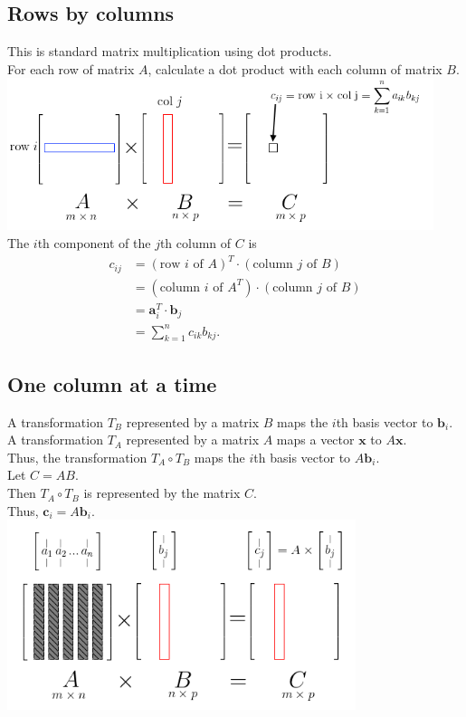 \documentclass{scrartcl}
\begin{document}
\subsection{Rows by columns}
This is standard matrix multiplication using dot products.\\
For each row of matrix \(A\), calculate a dot product with each column of matrix \(B\).\\
\includegraphics[height=12em]{row-by-columns.png}\\
The \(i\)th component of the \(j\)th column of \(C\) is
\begin{align*}
  c_{ij} &= (\text{row \(i\) of \(A\)})^T \cdot (\text{column \(j\) of \(B\)})\\
         &= (\text{column \(i\) of \(A^T\)}) \cdot (\text{column \(j\) of \(B\)})\\
         &= \mathbf{a}^T_i \cdot \mathbf{b}_j\\
         &= \sum_{k=1}^n{c_{ik}b_{kj}}\text{.}
\end{align*}

\subsection{One column at a time}
A transformation \(T_B\) represented by a matrix \(B\) maps the \(i\)th basis vector to \(\mathbf{b}_i\).\\
A transformation \(T_A\) represented by a matrix \(A\) maps a vector \(\mathbf{x}\) to \(A\mathbf{x}\).\\
Thus, the transformation \(T_A \circ T_B\) maps the \(i\)th basis vector to \(A\mathbf{b}_i\).\\
Let \(C = AB\).\\
Then \(T_A \circ T_B\) is represented by the matrix \(C\).\\
Thus, \(\mathbf{c}_i = A\mathbf{b}_i\).\\
\includegraphics[height=15em]{one-column-at-a-time.png}
\end{document}

